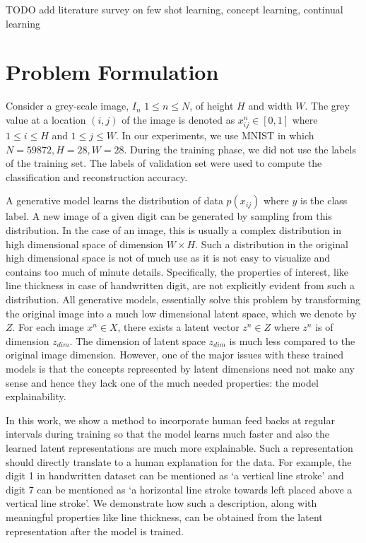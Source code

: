 \documentclass{uai2021} %
\begin{document}
TODO add literature survey on few shot learning, concept learning, continual learning

\section{Problem Formulation} \label{problem_formulation}
Consider a grey-scale image, $I_n$  $1\leq n \leq N$,  of height  $H$ and width $W$. The grey value at a location $(i, j)$ of the image is denoted  as $x_{ij}^{n} \in [0,1]$  where $1 \leq i \leq H$  and  $1\leq j \leq W$.
In our experiments, we use MNIST in which $N= 59872, H=28,  W= 28$. During the training phase, we did not use the labels of the training set.
The labels of validation set were used to compute the classification and reconstruction accuracy.

 A generative model learns the distribution of data $p(x_{ij})$ where $y$ is the class label.
A new image of a given digit can be generated by sampling from this distribution.
In the case of an image, this is usually a complex distribution in high dimensional space of dimension $W \times H$.
Such a distribution in the original high dimensional space is not of much use as it is not easy to visualize and contains too much of  minute details.
Specifically, the properties of interest, like line thickness in case of handwritten digit, are not explicitly evident from such a distribution.
All generative models, essentially solve this problem by transforming the original image into a much low dimensional latent space, which we denote by  $Z$.
For each image $x^n \in X$, there exists a latent vector  $z^n \in Z$  where $z^n$ is of dimension $z_{dim}$.
The dimension of latent space $z_{dim}$ is much less compared to the original image dimension.
However, one of the major issues with these trained models is that the concepts represented by latent dimensions need not make any sense and hence they lack one of the much needed properties: the model explainability.

  In this work, we show a method to incorporate human feed backs at regular intervals during training so that the model learns much faster and also the learned latent representations are much more explainable.
Such a representation should directly translate to a human explanation for the data.
For example, the digit 1 in  handwritten dataset  can be mentioned as  `a vertical line stroke'  and digit 7 can be mentioned as `a horizontal line stroke towards left placed  above a vertical line stroke'.
We demonstrate how  such a description, along with meaningful properties like line thickness, can be obtained from the latent representation after the model is trained.
\end{document}
